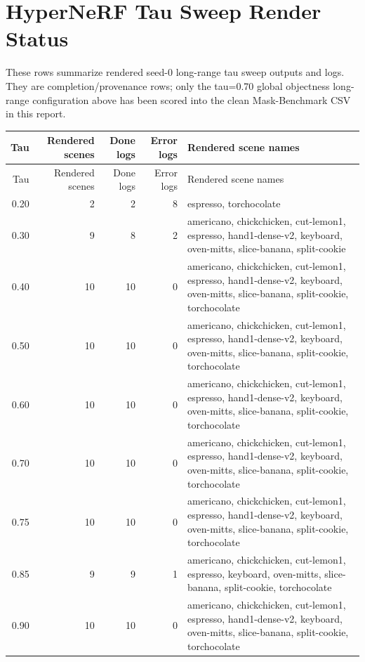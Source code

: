 \documentclass[10pt]{article}
\begin{document}
\section{HyperNeRF Tau Sweep Render Status}
These rows summarize rendered seed-0 long-range tau sweep outputs and logs. They are completion/provenance rows; only the tau=0.70 global objectness long-range configuration above has been scored into the clean Mask-Benchmark CSV in this report.
\small
\begin{longtable}{rrrrp{18cm}}
\toprule
Tau & Rendered scenes & Done logs & Error logs & Rendered scene names \\
\midrule
\endfirsthead
\toprule
Tau & Rendered scenes & Done logs & Error logs & Rendered scene names \\
\midrule
\endhead
0.20 & 2 & 2 & 8 & espresso, torchocolate \\
0.30 & 9 & 8 & 2 & americano, chickchicken, cut-lemon1, espresso, hand1-dense-v2, keyboard, oven-mitts, slice-banana, split-cookie \\
0.40 & 10 & 10 & 0 & americano, chickchicken, cut-lemon1, espresso, hand1-dense-v2, keyboard, oven-mitts, slice-banana, split-cookie, torchocolate \\
0.50 & 10 & 10 & 0 & americano, chickchicken, cut-lemon1, espresso, hand1-dense-v2, keyboard, oven-mitts, slice-banana, split-cookie, torchocolate \\
0.60 & 10 & 10 & 0 & americano, chickchicken, cut-lemon1, espresso, hand1-dense-v2, keyboard, oven-mitts, slice-banana, split-cookie, torchocolate \\
0.70 & 10 & 10 & 0 & americano, chickchicken, cut-lemon1, espresso, hand1-dense-v2, keyboard, oven-mitts, slice-banana, split-cookie, torchocolate \\
0.75 & 10 & 10 & 0 & americano, chickchicken, cut-lemon1, espresso, hand1-dense-v2, keyboard, oven-mitts, slice-banana, split-cookie, torchocolate \\
0.85 & 9 & 9 & 1 & americano, chickchicken, cut-lemon1, espresso, keyboard, oven-mitts, slice-banana, split-cookie, torchocolate \\
0.90 & 10 & 10 & 0 & americano, chickchicken, cut-lemon1, espresso, hand1-dense-v2, keyboard, oven-mitts, slice-banana, split-cookie, torchocolate \\
\bottomrule
\end{longtable}
\normalsize
\end{document}
